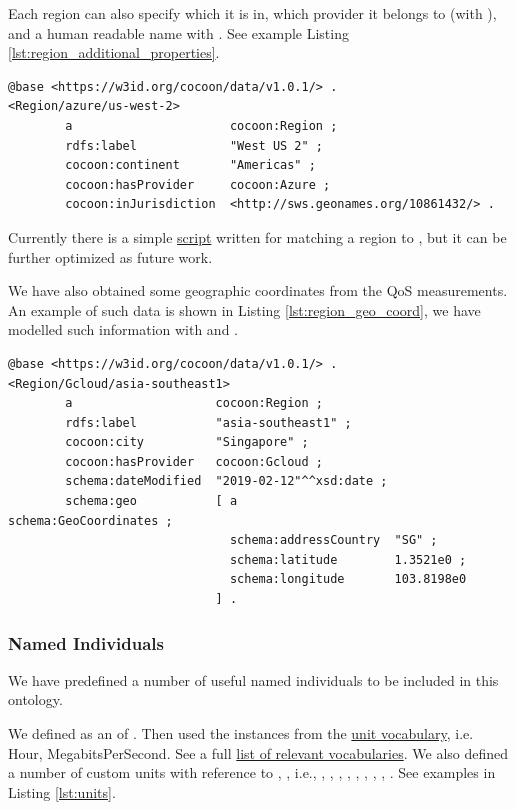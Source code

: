 Each region can also specify which  it is in,
which provider it belongs to (with ),
and a human readable name with .
See example Listing \ref{lst:region_additional_properties}.

\begin{lstlisting}[caption={Region additional properties},label={lst:region_additional_properties}]
@base <https://w3id.org/cocoon/data/v1.0.1/> .
<Region/azure/us-west-2>
        a                      cocoon:Region ;
        rdfs:label             "West US 2" ;
        cocoon:continent       "Americas" ;
        cocoon:hasProvider     cocoon:Azure ;
        cocoon:inJurisdiction  <http://sws.geonames.org/10861432/> .
\end{lstlisting}

Currently there is a simple \href{https://github.com/miranda-zhang/cloud-computing-schema/tree/master/example/geonames_rdf/azure}{script} written for matching a region to , but it can be further optimized as future work.

We have also obtained some geographic coordinates from the QoS measurements.
An example of such data is shown in Listing \ref{lst:region_geo_coord}, we have modelled such information with  and .

\begin{lstlisting}[caption={Region Geo Coordinates},label={lst:region_geo_coord}]
@base <https://w3id.org/cocoon/data/v1.0.1/> .
<Region/Gcloud/asia-southeast1>
        a                    cocoon:Region ;
        rdfs:label           "asia-southeast1" ;
        cocoon:city          "Singapore" ;
        cocoon:hasProvider   cocoon:Gcloud ;
        schema:dateModified  "2019-02-12"^^xsd:date ;
        schema:geo           [ a                      schema:GeoCoordinates ;
                               schema:addressCountry  "SG" ;
                               schema:latitude        1.3521e0 ;
                               schema:longitude       103.8198e0
                             ] .
\end{lstlisting}

\subsubsection{Named Individuals}
\label{sec:NamedIndividuals}
We have predefined a number of useful named individuals to be included in this ontology.

\label{sec:unit}
We defined  as an  of .
Then used the instances from the \href{http://qudt.org/1.1/vocab/OVG_units-qudt-(v1.1).ttl}{unit vocabulary},
i.e. \unit{Hour}, \unit{MegabitsPerSecond}. See a full
\href{https://github.com/miranda-zhang/cloud-computing-schema/blob/master/example/unit/QUDT.md#relevant-vocabularies}{list of relevant vocabularies}.
We also defined a number of custom units with reference to ,
, i.e., , , , , , , , , .
See examples in Listing \ref{lst:units}.

